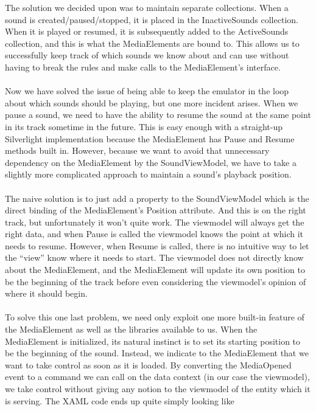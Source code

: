 \documentclass[12pt]{article}
\begin{document}
The solution we decided upon was to maintain separate collections. When a sound is created/paused/stopped, it is placed in the InactiveSounds collection. When it is played or resumed, it is subsequently added to the ActiveSounds collection, and this is what the MediaElements are bound to. This allows us to successfully keep track of which sounds we know about and can use without having to break the rules and make calls to the MediaElement’s interface. \\\\
Now we have solved the issue of being able to keep the emulator in the loop about which sounds should be playing, but one more incident arises. When we pause a sound, we need to have the ability to resume the sound at the same point in its track sometime in the future. This is easy enough with a straight-up Silverlight implementation because the MediaElement has Pause and Resume methods built in. However, because we want to avoid that unnecessary dependency on the MediaElement by the SoundViewModel, we have to take a slightly more complicated approach to maintain a sound’s playback position. \\\\
The naive solution is to just add a property to the SoundViewModel which is the direct binding of the MediaElement’s Position attribute. And this is on the right track, but unfortunately it won’t quite work. The viewmodel will always get the right data, and when Pause is called the viewmodel knows the point at which it needs to resume. However, when Resume is called, there is no intuitive way to let the “view” know where it needs to start. The viewmodel does not directly know about the MediaElement, and the MediaElement will update its own position to be the beginning of the track before even considering the viewmodel’s opinion of where it should begin. \\\\
To solve this one last problem, we need only exploit one more built-in feature of the MediaElement as well as the libraries available to us. When the MediaElement is initialized, its natural instinct is to set its starting position to be the beginning of the sound. Instead, we indicate to the MediaElement that we want to take control as soon as it is loaded. By converting the MediaOpened event to a command we can call on the data context (in our case the viewmodel), we take control without giving any notion to the viewmodel of the entity which it is serving. The XAML code ends up quite simply looking like \\\\
\end{document}
